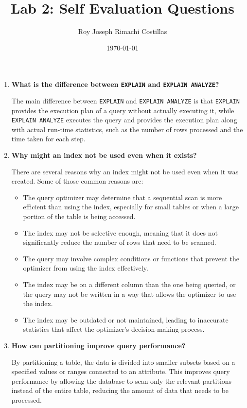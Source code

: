 \documentclass[11pt]{article}
\title{Lab 2\@: Self Evaluation Questions}
\author{Roy Joseph Rimachi Costillas}
\date{\today}
\begin{document}
\maketitle

\begin{enumerate}
      \item \textbf{What is the difference between \texttt{EXPLAIN} and \texttt{EXPLAIN ANALYZE}?}

            The main difference between \texttt{EXPLAIN} and \texttt{EXPLAIN ANALYZE} is that \texttt{EXPLAIN} provides the execution plan of a query without actually executing it, while \texttt{EXPLAIN ANALYZE} executes the query and provides the execution plan along with actual run-time statistics, such as the number of rows processed and the time taken for each step.

      \item \textbf{Why might an index not be used even when it exists?}

            There are several reasons why an index might not be used even when it was created. Some of those common reasons are:

            \begin{itemize}
                  \item The query optimizer may determine that a sequential scan is more efficient than using the index, especially for small tables or when a large portion of the table is being accessed.
                  \item The index may not be selective enough, meaning that it does not significantly reduce the number of rows that need to be scanned.
                  \item The query may involve complex conditions or functions that prevent the optimizer from using the index effectively.
                  \item The index may be on a different column than the one being queried, or the query may not be written in a way that allows the optimizer to use the index.
                  \item The index may be outdated or not maintained, leading to inaccurate statistics that affect the optimizer's decision-making process.
            \end{itemize}

      \item \textbf{How can partitioning improve query performance?}

            By partitioning a table, the data is divided into smaller subsets based on a specified values or ranges connected to an attribute. This improves query performance by allowing the database to scan only the relevant partitions instead of the entire table, reducing the amount of data that needs to be processed.

\end{enumerate}
\end{document}
